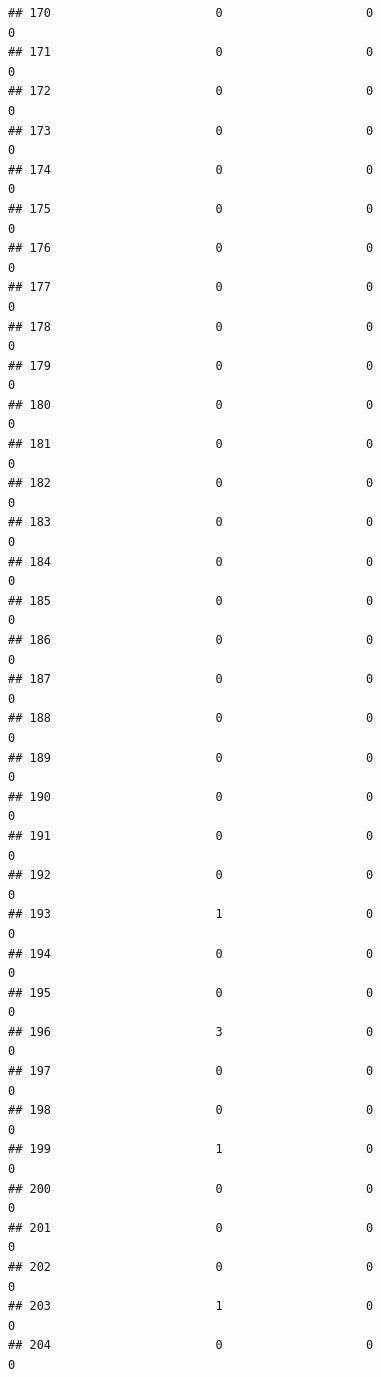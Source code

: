 \documentclass[
]{article}
\begin{document}
\begin{verbatim}
## 170                       0                    0                      0
## 171                       0                    0                      0
## 172                       0                    0                      0
## 173                       0                    0                      0
## 174                       0                    0                      0
## 175                       0                    0                      0
## 176                       0                    0                      0
## 177                       0                    0                      0
## 178                       0                    0                      0
## 179                       0                    0                      0
## 180                       0                    0                      0
## 181                       0                    0                      0
## 182                       0                    0                      0
## 183                       0                    0                      0
## 184                       0                    0                      0
## 185                       0                    0                      0
## 186                       0                    0                      0
## 187                       0                    0                      0
## 188                       0                    0                      0
## 189                       0                    0                      0
## 190                       0                    0                      0
## 191                       0                    0                      0
## 192                       0                    0                      0
## 193                       1                    0                      0
## 194                       0                    0                      0
## 195                       0                    0                      0
## 196                       3                    0                      0
## 197                       0                    0                      0
## 198                       0                    0                      0
## 199                       1                    0                      0
## 200                       0                    0                      0
## 201                       0                    0                      0
## 202                       0                    0                      0
## 203                       1                    0                      0
## 204                       0                    0                      0

\end{verbatim}
\end{document}

